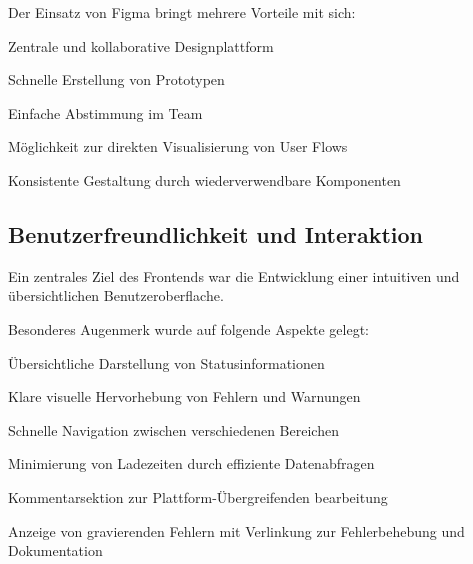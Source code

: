 Der Einsatz von Figma bringt mehrere Vorteile mit sich:
\begin{compactitem}
    \item Zentrale und kollaborative Designplattform
    \item Schnelle Erstellung von Prototypen
    \item Einfache Abstimmung im Team
    \item Möglichkeit zur direkten Visualisierung von User Flows
    \item Konsistente Gestaltung durch wiederverwendbare Komponenten
\end{compactitem}


\cite{figma}

\subsection{Benutzerfreundlichkeit und Interaktion}

Ein zentrales Ziel des Frontends war die Entwicklung einer intuitiven und übersichtlichen Benutzeroberflache.

Besonderes Augenmerk wurde auf folgende Aspekte gelegt:
\begin{compactitem}
    \item Übersichtliche Darstellung von Statusinformationen
    \item Klare visuelle Hervorhebung von Fehlern und Warnungen
    \item Schnelle Navigation zwischen verschiedenen Bereichen
    \item Minimierung von Ladezeiten durch effiziente Datenabfragen
    \item Kommentarsektion zur Plattform-Übergreifenden bearbeitung
    \item Anzeige von gravierenden Fehlern mit Verlinkung zur Fehlerbehebung und Dokumentation
\end{compactitem}


\newpage